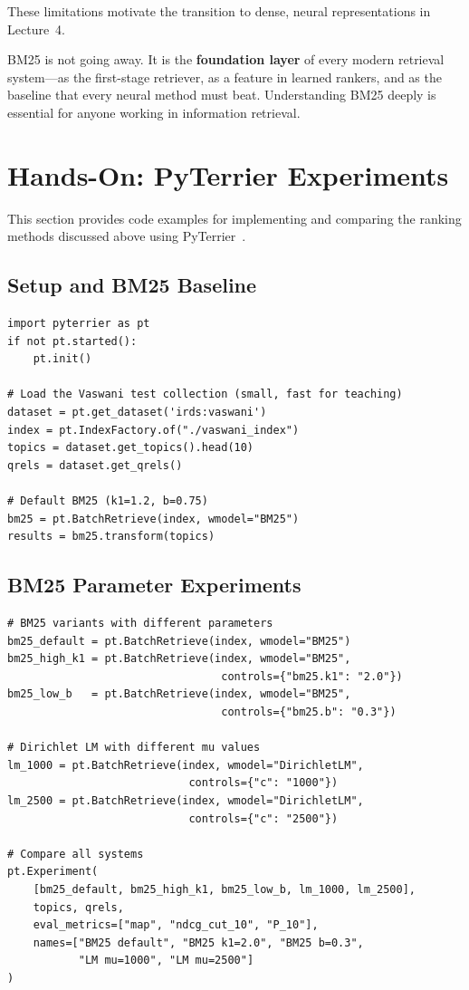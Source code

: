 \documentclass[11pt,a4paper]{article}
\theoremstyle{definition}
\theoremstyle{plain}
\begin{document}
These limitations motivate the transition to dense, neural representations in Lecture~4.

\begin{keytakeaway}
BM25 is not going away. It is the \textbf{foundation layer} of every modern retrieval system---as the first-stage retriever, as a feature in learned rankers, and as the baseline that every neural method must beat. Understanding BM25 deeply is essential for anyone working in information retrieval.
\end{keytakeaway}


\section{Hands-On: PyTerrier Experiments}
\label{sec:pyterrier}

This section provides code examples for implementing and comparing the ranking methods discussed above using PyTerrier~\cite{macdonald2021pyterrier}.

\subsection{Setup and BM25 Baseline}

\begin{lstlisting}
import pyterrier as pt
if not pt.started():
    pt.init()

# Load the Vaswani test collection (small, fast for teaching)
dataset = pt.get_dataset('irds:vaswani')
index = pt.IndexFactory.of("./vaswani_index")
topics = dataset.get_topics().head(10)
qrels = dataset.get_qrels()

# Default BM25 (k1=1.2, b=0.75)
bm25 = pt.BatchRetrieve(index, wmodel="BM25")
results = bm25.transform(topics)
\end{lstlisting}

\subsection{BM25 Parameter Experiments}

\begin{lstlisting}
# BM25 variants with different parameters
bm25_default = pt.BatchRetrieve(index, wmodel="BM25")
bm25_high_k1 = pt.BatchRetrieve(index, wmodel="BM25",
                                 controls={"bm25.k1": "2.0"})
bm25_low_b   = pt.BatchRetrieve(index, wmodel="BM25",
                                 controls={"bm25.b": "0.3"})

# Dirichlet LM with different mu values
lm_1000 = pt.BatchRetrieve(index, wmodel="DirichletLM",
                            controls={"c": "1000"})
lm_2500 = pt.BatchRetrieve(index, wmodel="DirichletLM",
                            controls={"c": "2500"})

# Compare all systems
pt.Experiment(
    [bm25_default, bm25_high_k1, bm25_low_b, lm_1000, lm_2500],
    topics, qrels,
    eval_metrics=["map", "ndcg_cut_10", "P_10"],
    names=["BM25 default", "BM25 k1=2.0", "BM25 b=0.3",
           "LM mu=1000", "LM mu=2500"]
)
\end{lstlisting}
\end{document}
